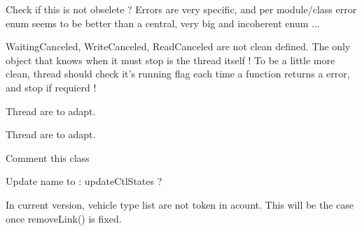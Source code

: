 
\begin{DoxyRefList}
\item[\label{todo__todo000077}%
\hypertarget{todo__todo000077}{}%
Member \hyperlink{mdt_error_8h_a0f1a2f7579a33e6de2fe8a1cbb5bbbb5}{mdt\-\_\-error\-\_\-t} ]Check if this is not obselete ? Errors are very specific, and per module/class error enum seems to be better than a central, very big and incoherent enum ...  
\item[\label{todo__todo000016}%
\hypertarget{todo__todo000016}{}%
Class \hyperlink{classmdt_abstract_port}{mdt\-Abstract\-Port} ]Waiting\-Canceled, Write\-Canceled, Read\-Canceled are not clean defined. The only object that knows when it must stop is the thread itself ! To be a little more clean, thread should check it's running flag each time a function returns a error, and stop if requierd !  
\item[\label{todo__todo000017}%
\hypertarget{todo__todo000017}{}%
Member \hyperlink{classmdt_abstract_port_a54b7bfb725c91b2c292a39275b877207}{mdt\-Abstract\-Port\-:\-:flush\-In\-Request\-Pending} ()]Thread are to adapt.  
\item[\label{todo__todo000018}%
\hypertarget{todo__todo000018}{}%
Member \hyperlink{classmdt_abstract_port_a2cc79d9288bebafaa183753dcf0807f3}{mdt\-Abstract\-Port\-:\-:flush\-Out\-Request\-Pending} ()]Thread are to adapt.  
\item[\label{todo__todo000040}%
\hypertarget{todo__todo000040}{}%
Class \hyperlink{classmdt_abstract_serial_port}{mdt\-Abstract\-Serial\-Port} ]Comment this class  
\item[\label{todo__todo000041}%
\hypertarget{todo__todo000041}{}%
Member \hyperlink{classmdt_abstract_serial_port_aaeacd26b220ab0f8c521cef74edfafdd}{mdt\-Abstract\-Serial\-Port\-:\-:get\-Ctl\-States} ()=0]Update name to \-: update\-Ctl\-States ?  
\item[\label{todo__todo000044}%
\hypertarget{todo__todo000044}{}%
Member \hyperlink{classmdt_cl_link_ac32bfef9f23b431ea4d3d546e6c21361}{mdt\-Cl\-Link\-:\-:disconnect\-Connectors} (const Q\-Variant \&start\-Unit\-Connector\-Id, const Q\-Variant \&end\-Unit\-Connector\-Id, const Q\-List$<$ Q\-Variant $>$ \&start\-Vehicle\-Type\-Id\-List, const Q\-List$<$ Q\-Variant $>$ \&end\-Vehicle\-Type\-Id\-List)]In current version, vehicle type list are not token in acount. This will be the case once remove\-Link() is fixed. 


\end{DoxyRefList}
